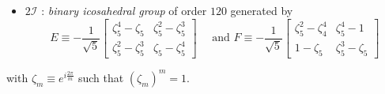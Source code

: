 \documentclass[a4paper,11pt]{article}
\begin{document}
\begin{itemize}
            \item $2\mathcal{I}$ : \emph{binary icosahedral group} of order $120$ generated by
            \begin{equation}
                E \equiv -\frac{1}{\sqrt{5}}
                \begin{bmatrix}
                    \zeta^4_5-\zeta_5 & \zeta^2_5-\zeta^3_5\\
                    \zeta^2_5-\zeta^3_5 & \zeta_5-\zeta^4_5
                \end{bmatrix}\quad \text{ and }
                F \equiv -\frac{1}{\sqrt{5}}
                \begin{bmatrix}
                    \zeta^2_5-\zeta^4_4 & \zeta^4_5-1\\
                    1-\zeta_5 & \zeta^3_5-\zeta_5
                \end{bmatrix}
            \end{equation}
        \end{itemize}
        with $\zeta_m\equiv e^{i\frac{2\pi}{m}}$ such that $(\zeta_m)^m=1$.
\end{document}
